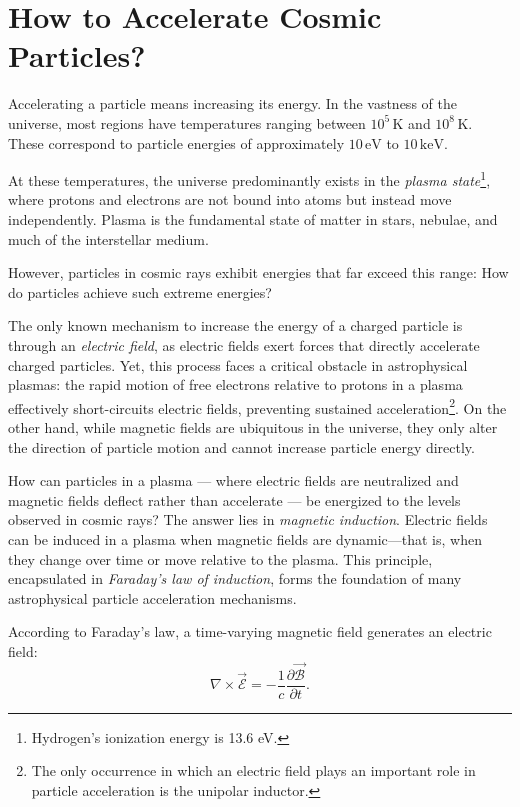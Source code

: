 \section{How to Accelerate Cosmic Particles?}

Accelerating a particle means increasing its energy. In the vastness of the universe, most regions have temperatures ranging between \( 10^5 \, \text{K} \) and \( 10^8 \, \text{K} \). These correspond to particle energies of approximately \( 10 \, \text{eV} \) to \( 10 \, \text{keV} \).

At these temperatures, the universe predominantly exists in the \emph{plasma state}\footnote{Hydrogen's ionization energy is 13.6 eV.}, where protons and electrons are not bound into atoms but instead move independently. Plasma is the fundamental state of matter in stars, nebulae, and much of the interstellar medium.

However, particles in cosmic rays exhibit energies that far exceed this range: How do particles achieve such extreme energies?

The only known mechanism to increase the energy of a charged particle is through an \emph{electric field}, as electric fields exert forces that directly accelerate charged particles. Yet, this process faces a critical obstacle in astrophysical plasmas: the rapid motion of free electrons relative to protons in a plasma effectively short-circuits electric fields, preventing sustained acceleration\footnote{The only occurrence in which an electric field plays an important role in particle acceleration is the unipolar inductor.}.
%   
On the other hand, while magnetic fields are ubiquitous in the universe, they only alter the direction of particle motion and cannot increase particle energy directly.

How can particles in a plasma --- where electric fields are neutralized and magnetic fields deflect rather than accelerate --- be energized to the levels observed in cosmic rays? The answer lies in \emph{magnetic induction}. Electric fields can be induced in a plasma when magnetic fields are dynamic—that is, when they change over time or move relative to the plasma. This principle, encapsulated in \emph{Faraday's law of induction}, forms the foundation of many astrophysical particle acceleration mechanisms.

According to Faraday's law, a time-varying magnetic field generates an electric field:
\[
\nabla \times \vec{\mathcal E} = -\frac{1}{c} \frac{\partial \vec{\mathcal B}}{\partial t}.
\]

